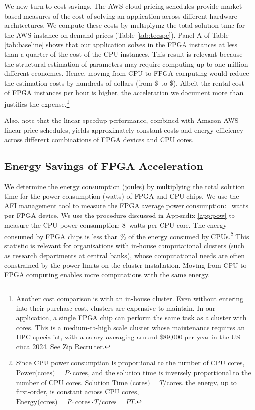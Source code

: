 \documentclass[12pt,american]{article}
\makeatletter
\newcommand{\resultsfolder}{./results}
\newcommand{\baselinespeedupFPGAICPUI}{\@\xspace}
\newcommand{\energyupperbound}{}
\newcommand{\CPUcostonemillioneconomies}{\$}
\newcommand{\FPGAcostonemillioneconomies}{\$\@\xspace}
\newcommand{\fpgaIpowerconsumption}{}
\newcommand{\fpgaIIIcpucostsavingwords}{less than a quarter of the cost of the CPU instances}
\newcommand{\cpuIpowerconsumption}{8}
\makeatother
\begin{document}
We now turn to cost savings. The AWS cloud pricing schedules provide market-based measures of the cost of solving an application across different hardware architectures. We compute these costs by multiplying the total solution time for the AWS instance on-demand prices (Table \ref{tab:tecspe}). Panel A of Table \ref{tab:baseline} shows that our application solves in the FPGA instances at \fpgaIIIcpucostsavingwords. This result is relevant because the structural estimation of parameters may require computing up to one million different economies. Hence, moving from CPU to FPGA computing would reduce the estimation costs by hundreds of dollars (from \CPUcostonemillioneconomies\, to \FPGAcostonemillioneconomies\hspace{-0.25cm}). Albeit the rental cost of FPGA instances per hour is higher, the acceleration we document more than justifies the expense.\footnote{Another cost comparison is with an in-house cluster. Even without entering into their purchase cost, clusters are expensive to maintain. In our application, a single FPGA chip can perform the same task as a cluster with \baselinespeedupFPGAICPUI\, cores. This is a medium-to-high scale cluster whose maintenance requires an HPC specialist, with a salary averaging around \$89,000 per year in the US circa 2024. See \href{https://www.ziprecruiter.com/Salaries/HPC-System-Administrator-Salary}{Zip Recruiter}.} 

Also, note that the linear speedup performance, combined with Amazon AWS linear price schedules, yields approximately constant costs and energy efficiency across different combinations of FPGA devices and CPU cores. 

\subsection{Energy Savings of FPGA Acceleration}\label{subsec:energy}

We determine the energy consumption (joules) by multiplying the total solution time for the power consumption (watts) of FPGA and CPU chips. We use the AFI management tool to measure the FPGA average power consumption: \fpgaIpowerconsumption\ watts per FPGA device. We use the procedure discussed in Appendix \ref{app:pow} to measure the CPU power consumption: \cpuIpowerconsumption \ watts per CPU core. The energy consumed by FPGA chips is less than \energyupperbound\hspace{-0.1cm}\% of the energy consumed by CPUs.\footnote{Since CPU power consumption is proportional to the number of CPU cores, $\text{Power(cores)}=P\cdot \text{cores}$, and the solution time is inversely proportional to the number of CPU cores, $\text{Solution Time (cores)}=T/\text{cores}$, the energy, up to first-order, is constant across CPU cores, $\text{Energy(cores)}=P\cdot \text{cores} \cdot T/\text{cores}= PT$.} This statistic is relevant for organizations with in-house computational clusters (such as research departments at central banks), whose computational needs are often constrained by the power limits on the cluster installation. Moving from CPU to FPGA computing enables more computations with the same energy.
\end{document}
